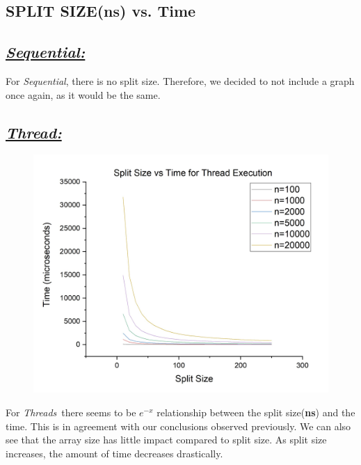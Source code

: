 \documentclass{article}
\begin{document}
        \subsection{SPLIT SIZE(\textbf{ns}) vs. Time}
            \subsection*{\textit{\underline{Sequential:}}}
                For \textit{Sequential}, there is no split size. Therefore, we decided to not include a graph once again, as it would be the same.
            \subsection*{\color{red}\textit{\underline{Thread:}}\color{black}}
                \begin{figure}[H]
                    \centering
                    \includegraphics[width=19cm]{nsvt-Thread}
                \end{figure}
                For \color{red}\textit{Threads}\color{black}\ there seems to be $e^{-x}$ relationship between the split size(\textbf{ns}) and the time. This is in agreement with our conclusions observed previously. We can also see that the array size has little impact compared to split size. As split size increases, the amount of time decreases drastically. 
            \pagebreak
\end{document}
